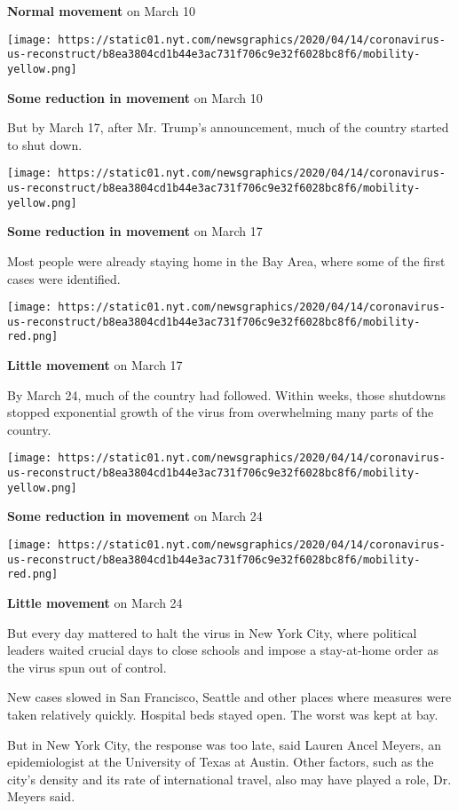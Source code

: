 \textbf{Normal movement} on March 10

\texttt{[image: https://static01.nyt.com/newsgraphics/2020/04/14/coronavirus-us-reconstruct/b8ea3804cd1b44e3ac731f706c9e32f6028bc8f6/mobility-yellow.png]}

\textbf{Some reduction in movement} on March 10

But by March 17, after Mr. Trump's announcement, much of the country
started to shut down.

\texttt{[image: https://static01.nyt.com/newsgraphics/2020/04/14/coronavirus-us-reconstruct/b8ea3804cd1b44e3ac731f706c9e32f6028bc8f6/mobility-yellow.png]}

\textbf{Some reduction in movement} on March 17

Most people were already staying home in the Bay Area, where some of the
first cases were identified.

\texttt{[image: https://static01.nyt.com/newsgraphics/2020/04/14/coronavirus-us-reconstruct/b8ea3804cd1b44e3ac731f706c9e32f6028bc8f6/mobility-red.png]}

\textbf{Little movement} on March 17

By March 24, much of the country had followed. Within weeks, those
shutdowns stopped exponential growth of the virus from overwhelming many
parts of the country.

\texttt{[image: https://static01.nyt.com/newsgraphics/2020/04/14/coronavirus-us-reconstruct/b8ea3804cd1b44e3ac731f706c9e32f6028bc8f6/mobility-yellow.png]}

\textbf{Some reduction in movement} on March 24

\texttt{[image: https://static01.nyt.com/newsgraphics/2020/04/14/coronavirus-us-reconstruct/b8ea3804cd1b44e3ac731f706c9e32f6028bc8f6/mobility-red.png]}

\textbf{Little movement} on March 24

But every day mattered to halt the virus in New York City, where
political leaders waited crucial days to close schools and impose a
stay-at-home order as the virus spun out of control.

New cases slowed in San Francisco, Seattle and other places where
measures were taken relatively quickly. Hospital beds stayed open. The
worst was kept at bay.

But in New York City, the response was too late, said Lauren Ancel
Meyers, an epidemiologist at the University of Texas at Austin. Other
factors, such as the city's density and its rate of international
travel, also may have played a role, Dr. Meyers said.

